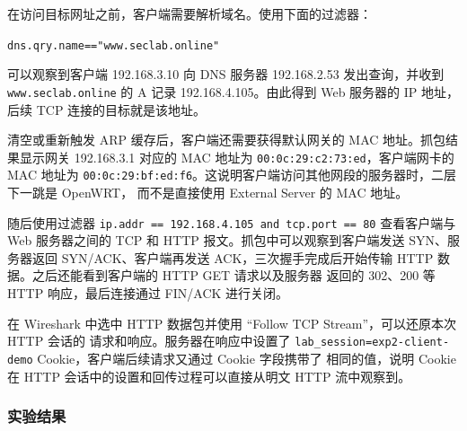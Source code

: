 
在访问目标网址之前，客户端需要解析域名。使用下面的过滤器：
\begin{center}
    \texttt{dns.qry.name=="www.seclab.online"}
\end{center}

可以观察到客户端
192.168.3.10 向 DNS 服务器 192.168.2.53 发出查询，并收到
\texttt{www.seclab.online} 的 A 记录 192.168.4.105。由此得到 Web 服务器的 IP 地址，
后续 TCP 连接的目标就是该地址。


清空或重新触发 ARP 缓存后，客户端还需要获得默认网关的 MAC 地址。抓包结果显示网关
192.168.3.1 对应的 MAC 地址为
\texttt{00:0c:29:c2:73:ed}，客户端网卡的 MAC 地址为
\texttt{00:0c:29:bf:ed:f6}。这说明客户端访问其他网段的服务器时，二层下一跳是 OpenWRT，
而不是直接使用 External Server 的 MAC 地址。


随后使用过滤器
\texttt{ip.addr == 192.168.4.105 and tcp.port == 80} 查看客户端与 Web 服务器之间的
TCP 和 HTTP 报文。抓包中可以观察到客户端发送 SYN、服务器返回 SYN/ACK、客户端再发送
ACK，三次握手完成后开始传输 HTTP 数据。之后还能看到客户端的 HTTP GET 请求以及服务器
返回的 302、200 等 HTTP 响应，最后连接通过 FIN/ACK 进行关闭。


在 Wireshark 中选中 HTTP 数据包并使用 ``Follow TCP Stream''，可以还原本次 HTTP 会话的
请求和响应。服务器在响应中设置了
\texttt{lab\_session=exp2-client-demo} Cookie，客户端后续请求又通过 Cookie 字段携带了
相同的值，说明 Cookie 在 HTTP 会话中的设置和回传过程可以直接从明文 HTTP 流中观察到。


\subsubsection{实验结果}

